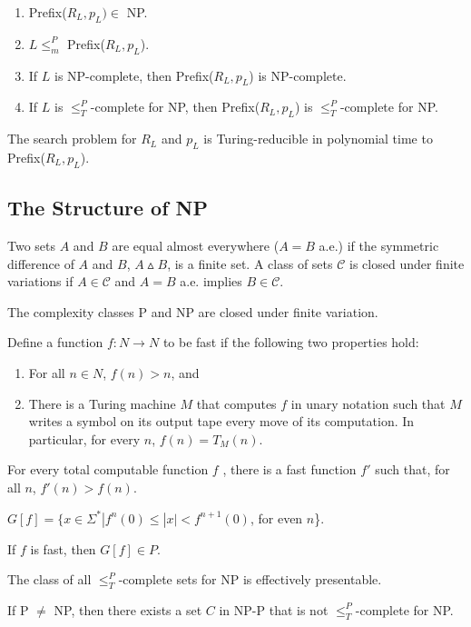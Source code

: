 \begin{enumerate}
  \item Prefix($R_L,p_ L) \in$ NP.
  \item $L \le^P_m$ Prefix($R_L,p_ L$).
  \item If $L$ is NP-complete, then Prefix($R_L,p_L$) is NP-complete.
  \item If $L$ is $\le^P_T$-complete for NP, then Prefix($R_L,p_ L$) is
    $\le^P_T$-complete for NP.
\end{enumerate}

 The search problem for $R_L$ and $p_L$ is Turing-reducible in
polynomial time to Prefix($R_L,p_L$).

\subsection{The Structure of NP}

 Two sets $A$ and $B$ are equal almost everywhere ($A = B$ a.e.)
if the symmetric difference of $A$ and $B$, $A \vartriangle B$, is a finite set.
A class of sets $\mathscr{C}$ is closed under finite variations if $A \in
\mathscr{C}$ and $A = B$ a.e. implies $B \in \mathscr{C}$.

The complexity classes P and NP are closed under finite variation.

 Define a function $f : N \rightarrow N$ to be fast if
the following two properties hold:
\begin{enumerate}
  \item For all $n \in N$, $f(n) > n$, and
  \item There is a Turing machine $M$ that computes $f$ in unary notation such
    that $M$ writes a symbol on its output tape every move of its computation. In particular,
    for every $n$, $f(n) = T_M(n)$.
\end{enumerate}

 For every total computable function $f$ , there is a fast
function $f'$ such that, for all $n$, $f'(n) > f(n)$.

 $G[f] = \{ x \in \Sigma^* | f^n(0) \le |x| < f^{n+1}(0)$, for even
$n$\}.

 If $f$ is fast, then $G[f] \in P$.

 The class of all $\le^P_T$-complete sets for NP is effectively presentable.

 If P $\ne$ NP, then there exists a set $C$ in NP-P
that is not $\le^P_T$-complete for NP.

